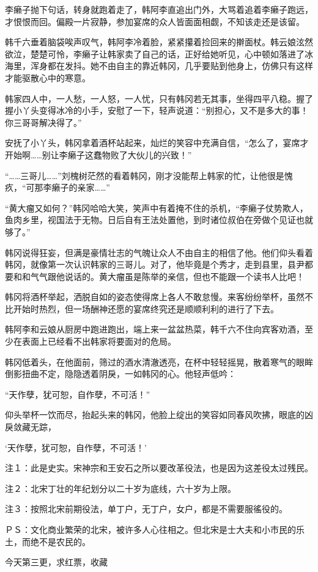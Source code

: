 李癞子抛下句话，转身就跑着走了，韩阿李直追出门外，大骂着追着李癞子跑远，才恨恨而回。偏殿一片寂静，参加宴席的众人皆面面相觑，不知该走还是该留。

韩千六垂着脑袋唉声叹气，韩阿李冷着脸，紧紧攥着捡回来的擀面杖。韩云娘泫然欲泣，楚楚可怜，李癞子让韩家卖了自己的话，正好给她听见，心中顿如落进了冰海里，浑身都在发抖。她不由自主的靠近韩冈，几乎要贴到他身上，仿佛只有这样才能驱散心中的寒意。

韩家四人中，一人愁，一人怒，一人忧，只有韩冈若无其事，坐得四平八稳。握了握小丫头变得冰冷的小手，安慰了一下，轻声说道：“别担心，又不是多大的事！你三哥哥解决得了。”

安抚了小丫头，韩冈拿着酒杯站起来，灿烂的笑容中充满自信，“怎么了，宴席才开始啊……别让李癞子这蠢物败了大伙儿的兴致！”

“……三哥儿……”刘槐树茫然的看着韩冈，刚才没能帮上韩家的忙，让他很是愧疚，“可那李癞子的亲家……”

“黄大瘤又如何？”韩冈哈哈大笑，笑声中有着掩不住的杀机，“李癞子仗势欺人，鱼肉乡里，视国法于无物。日后自有王法处置他，到时诸位叔伯在旁做个见证也就够了。”

韩冈说得狂妄，但满是豪情壮志的气魄让众人不由自主的相信了他。他们仰头看着韩冈，就像第一次认识韩家的三哥儿。对了，他毕竟是个秀才，走到县里，县尹都要和和气气跟他说话的。黄大瘤虽是陈举的亲信，但也不能跟一个读书人比吧！

韩冈将酒杯举起，洒脱自如的姿态使得席上各人不敢怠慢。来客纷纷举杯，虽然不比开始时热烈，但一场酬神还愿的宴席终究还是顺顺利利的进行了下去。

韩阿李和云娘从厨房中跑进跑出，端上来一盆盆热菜，韩千六不住向宾客劝酒，至少在表面上已经看不出韩家将要面对的危局。

韩冈低着头，在他面前，筛过的酒水清澈透亮，在杯中轻轻摇晃，散着寒气的眼眸倒影扭曲不定，隐隐透着阴戾，一如韩冈的心。他轻声低吟：

“天作孽，犹可恕，自作孽，不可活！”

仰头举杯一饮而尽，抬起头来的韩冈，他脸上绽出的笑容如同春风吹拂，眼底的凶戾敛藏无踪，

‘天作孽，犹可恕，自作孽，不可活！’

注１：此是史实。宋神宗和王安石之所以要改革役法，也是因为这差役太过残民。

注２：北宋丁壮的年纪划分以二十岁为底线，六十岁为上限。

注３：按照北宋前期役法，单丁户，无丁户，女户，都是不需要服徭役的。

ＰＳ：文化商业繁荣的北宋，被许多人心往相之。但北宋是士大夫和小市民的乐土，而绝不是农民的。

今天第三更，求红票，收藏

